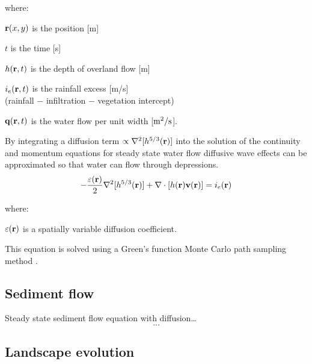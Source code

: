 \documentclass[10pt,letterpaper]{article}
\begin{document}
where:

\hspace*{1em} ${\bf r}(x,y)$ is the position [m]

\hspace*{1em} $t$ is the time [s]

\hspace*{1em} $h({\bf r},t)$ is the depth of overland flow [m]

\hspace*{1em} $i_e({\bf r},t)$ is the rainfall excess [m/s]\\
\hspace*{1em} (rainfall $-$ infiltration $-$ vegetation intercept) 

\hspace*{1em} ${\bf q}({\bf r},t)$ is the water flow per unit width [$\rm m^2/s$].

By integrating a diffusion term $ \propto \nabla^2 [h^{5/3}({\bf r})]$ 
into
the solution of the continuity and momentum equations for steady state water flow
diffusive wave effects can be approximated
so that water can flow through depressions. 
%
\begin{equation}
\label{eq:difwater}
-{\varepsilon({\bf r})\over 2 }\nabla^2 [h^{5/3}({\bf r})]
+\nabla \cdot [ h({\bf r}){\bf v}({\bf r})] = i_e({\bf r})
\end{equation}

 where:
 
 \hspace*{1em} $\varepsilon({\bf r})$ is a spatially variable diffusion coefficient.

This equation is solved using a Green's function Monte Carlo path sampling method \cite{mitasova2004}.





\subsection*{Sediment flow}

Steady state sediment flow equation with diffusion\ldots
\begin{equation}\label{eq:sediment} 
...
\end{equation}


\subsection*{Landscape evolution}
\end{document}
